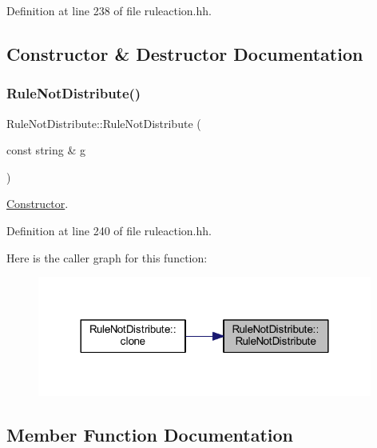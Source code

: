 Definition at line 238 of file ruleaction.\+hh.



\subsection{Constructor \& Destructor Documentation}
\mbox{\label{class_rule_not_distribute_a314c8875a54b09a0206cafb4c023d08a}} 
\subsubsection{\texorpdfstring{RuleNotDistribute()}{RuleNotDistribute()}}
{\footnotesize\ttfamily Rule\+Not\+Distribute\+::\+Rule\+Not\+Distribute (\begin{DoxyParamCaption}\item[{const string \&}]{g }\end{DoxyParamCaption})\hspace{0.3cm}{\ttfamily [inline]}}



\mbox{\hyperlink{class_constructor}{Constructor}}. 



Definition at line 240 of file ruleaction.\+hh.

Here is the caller graph for this function\+:
\nopagebreak
\begin{figure}[H]
\begin{center}
\leavevmode
\includegraphics[width=312pt]{class_rule_not_distribute_a314c8875a54b09a0206cafb4c023d08a_icgraph}
\end{center}
\end{figure}


\subsection{Member Function Documentation}
\mbox{\label{class_rule_not_distribute_af010b4c83cf55e7c1c858941f72e048b}} 
